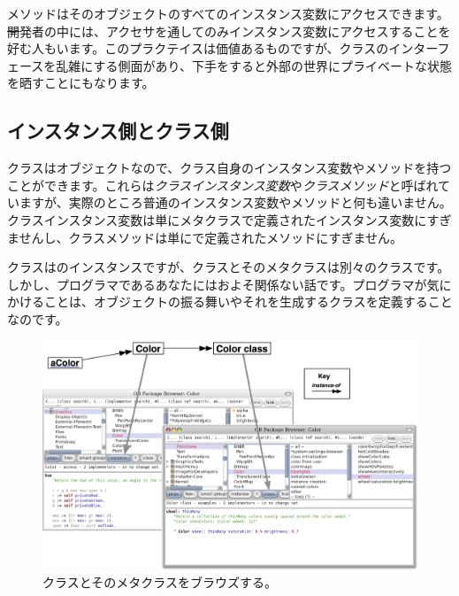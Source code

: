 \documentclass[a4paper,10pt,twoside]{book}
\begin{document}
メソッドはそのオブジェクトのすべてのインスタンス変数にアクセスできます。\st 開発者の中には、アクセサを通してのみインスタンス変数にアクセスすることを好む人もいます。このプラクテイスは価値あるものですが、クラスのインターフェースを乱雑にする側面があり、下手をすると外部の世界にプライベートな状態を晒すことにもなります。

\subsection{インスタンス側とクラス側}

クラスはオブジェクトなので、クラス自身のインスタンス変数やメソッドを持つことができます。これらは\emph{クラスインスタンス変数}や\emph{クラスメソッド}と呼ばれていますが、実際のところ普通のインスタンス変数やメソッドと何も違いません。クラスインスタンス変数は単にメタクラスで定義されたインスタンス変数にすぎませんし、クラスメソッドは単にで定義されたメソッドにすぎません。

クラスはのインスタンスですが、クラスとそのメタクラスは別々のクラスです。しかし、プログラマであるあなたにはおよそ関係ない話です。プログラマが気にかけることは、オブジェクトの振る舞いやそれを生成するクラスを定義することなのです。

\begin{figure}[htb]
\begin{center}
\includegraphics[width=\textwidth]{Color-Buttons}
\caption{クラスとそのメタクラスをブラウズする。
}
\end{center}
\end{figure}
\end{document}
